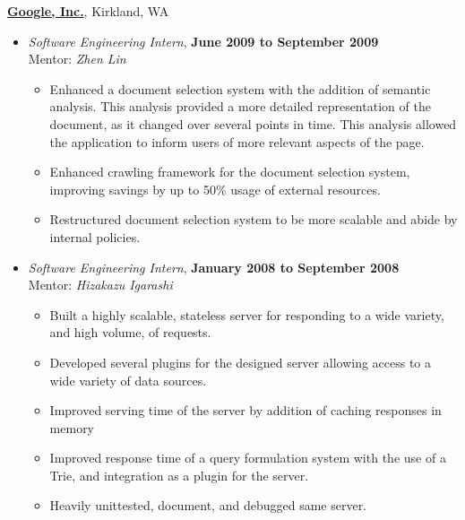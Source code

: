 \documentclass[10pt]{article}
\newenvironment{outerlist}[1][\enskip\textbullet]%
        {\begin{itemize}[#1,leftmargin=*]}{\end{itemize}%
         \vspace{-.6\baselineskip}}
\newenvironment{innerlist}[1][\enskip\textbullet]%
        {\begin{itemize}[#1,leftmargin=*,parsep=0pt,itemsep=0pt,topsep=0pt,partopsep=0pt]}
        {\end{itemize}}
\begin{document}
\href{http://www.google.com}{\textbf{Google, Inc.}}, 
Kirkland, WA
\begin{outerlist}

\item[] \textit{Software Engineering Intern},
        \textbf{June 2009 to September 2009}\\
        Mentor: \textit{Zhen Lin} \\

        \begin{innerlist}
        \item Enhanced a document selection system with the addition of semantic
              analysis.  This analysis provided a more detailed representation
              of the document, as it changed over several points in time. This
              analysis allowed the application to inform users of more relevant
              aspects of the page.
        \item Enhanced crawling framework for the document selection system,
              improving savings by up to 50\% usage of external resources.
        \item Restructured document selection system to be more scalable and
              abide by internal policies.
        \end{innerlist}

\item[] \textit{Software Engineering Intern},
        \textbf{January 2008 to September 2008}\\
        Mentor: \textit{Hizakazu Igarashi} \\

        \begin{innerlist}
        \item Built a highly scalable, stateless server for responding to a wide
              variety, and high volume, of requests.
        \item Developed several plugins for the designed server allowing access
              to a wide variety of data sources.
        \item Improved serving time of the server by addition of caching
              responses in memory
        \item Improved response time of a query formulation system with the use
              of a Trie, and integration as a plugin for the server.
        \item Heavily unittested, document, and debugged same server. \\
        \end{innerlist}

\end{outerlist}
\end{document}
